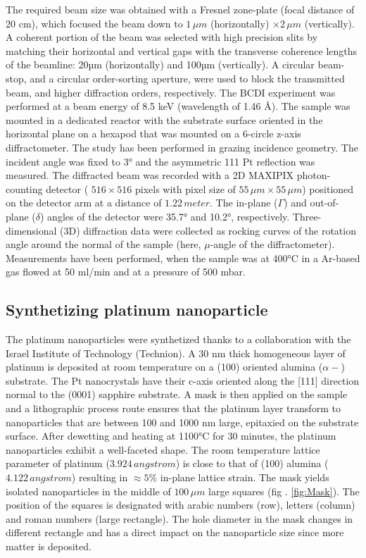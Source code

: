 The required beam size was obtained with a Fresnel zone-plate (focal distance of 20 cm), which focused the beam down to $1\, \mu m$ (horizontally) $\times 2\, \mu m$ (vertically).
A coherent portion of the beam was selected with high precision slits by matching their horizontal and vertical gaps with the transverse coherence lengths of the beamline: 20µm (horizontally) and 100µm (vertically).
A circular beam-stop, and a circular order-sorting aperture, were used to block the transmitted beam, and higher diffraction orders, respectively.
The BCDI experiment was performed at a beam energy of 8.5 keV (wavelength of 1.46 Å). The sample was mounted in a dedicated reactor with the substrate surface oriented in the horizontal plane on a hexapod that was mounted on a 6-circle z-axis diffractometer.
The study has been performed in grazing incidence geometry.
The incident angle was fixed to 3° and the asymmetric 111 Pt reflection was measured.
The diffracted beam was recorded with a 2D MAXIPIX photon-counting detector ( $516 \times 516$ pixels with pixel size of $55 \, \mu m \times 55 \, \mu m$) positioned on the detector arm at a distance of $1.22 \, \si{meter}$.
The in-plane ($\Gamma$) and out-of-plane ($\delta$) angles of the detector were 35.7°
and 10.2°, respectively.
Three-dimensional (3D) diffraction data were collected as rocking curves of the rotation angle around the normal of the sample (here, $\mu$-angle of the diffractometer).
Measurements have been performed, when the sample was at 400°C in a Ar-based gas flowed at 50 ml/min and at a pressure of 500 mbar.

\subsection{Synthetizing platinum nanoparticle}

The platinum nanoparticles were synthetized thanks to a collaboration with the Israel Institute of Technology (Technion).
A 30 nm thick homogeneous layer of platinum is deposited at room temperature on a (100) oriented alumina ($\alpha-$) substrate.
The Pt nanocrystals have their c-axis oriented along the [111] direction normal to the (0001) sapphire substrate.
A mask is then applied on the sample and a lithographic process route ensures that the platinum layer transform to nanoparticles that are between 100 and 1000 nm large,  epitaxied on the substrate surface.
After dewetting and heating at 1100°C for 30 minutes, the platinum nanoparticles exhibit a well-faceted shape.
The room temperature lattice parameter of platinum ($3.924 \, \si{angstrom}$) is close to that of (100) alumina ($4.122 \, \si{angstrom}$) resulting in $\approx 5 \%$ in-plane lattice strain.
The mask yields isolated nanoparticles in the middle of $100 \, \mu m$ large squares (fig . \ref{fig:Mask}).
The position of the squares is designated with arabic numbers (row), letters (column) and roman numbers (large rectangle).
The hole diameter in the mask changes in different rectangle and has a direct impact on the nanoparticle size since more matter is deposited.

